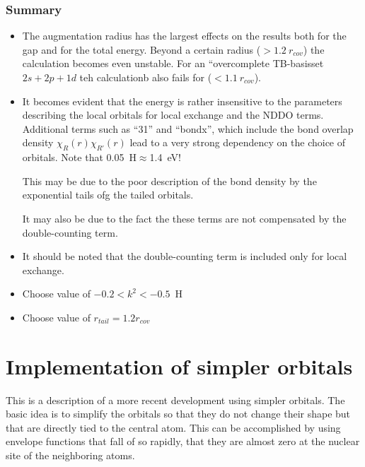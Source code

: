 \documentclass[11pt,a4paper]{report}
\begin{document}
\subsection{Summary}
\begin{itemize}
\item The augmentation radius has the largest effects on the results
  both for the gap and for the total energy. Beyond a certain radius
  ($>1.2~r_{cov}$) the calculation becomes even unstable. For an
  ``overcomplete TB-basisset $2s+2p+1d$ teh calculationb also fails for
  ($<1.1~r_{cov}$).
%
\item It becomes evident that the energy is rather insensitive to the
  parameters describing the local orbitals for local exchange and the
  NDDO terms. Additional terms such as ``31'' and ``bondx'', which
  include the bond overlap density $\chi_R(r)\chi_{R'}(r)$ lead to a
  very strong dependency on the choice of orbitals. Note that
  0.05~H$\approx$1.4~eV!

  This may be due to the poor description of the bond density by the
  exponential tails ofg the tailed orbitals.

  It may also be due to the fact the these terms are not compensated
  by the double-counting term.
% 
\item It should be noted that the double-counting term is included
  only for local exchange.
%
\item Choose value of $-0.2<k^2<-0.5$~H 
%
\item Choose value of $r_{tail}=1.2 r_{cov}$
\end{itemize}


\chapter{Implementation of simpler orbitals}
This is a description of a more recent development using simpler
orbitals. The basic idea is to simplify the orbitals so that they do
not change their shape but that are directly tied to the central
atom. This can be accomplished by using envelope functions that fall
of so rapidly, that they are almost zero at the nuclear site of the
neighboring atoms.






\end{document}
